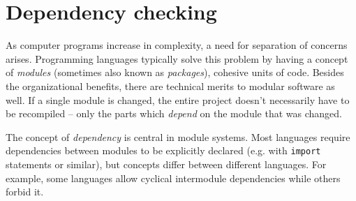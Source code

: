 \section{Dependency checking}


As computer programs increase in complexity, a need for separation of concerns arises. Programming languages typically solve this problem by having a concept of \emph{modules} (sometimes also known as \emph{packages}), cohesive units of code. Besides the organizational benefits, there are technical merits to modular software as well. If a single module is changed, the entire project doesn't necessarily have to be recompiled -- only the parts which \emph{depend} on the module that was changed.

The concept of \emph{dependency} is central in module systems. Most languages require dependencies between modules to be explicitly declared (e.g. with \texttt{import} statements or similar), but concepts differ between different languages. For example, some languages allow cyclical intermodule dependencies while others forbid it. 